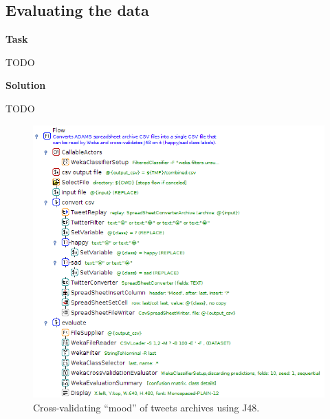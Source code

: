 \documentclass[a4paper,10pt]{book}
\newcommand{\heading}[1]{
  \vspace{0.3cm} \noindent \textbf{#1} \newline
}
\begin{document}
\subsection{Evaluating the data}

\heading{Task}
TODO

\heading{Solution}
TODO

\begin{figure}[htb]
  \centering
  \includegraphics[width=12.0cm]{images/crossvalidate_csv_archive-flow.png}
  \caption{Cross-validating ``mood'' of tweets archives using J48.}
  \label{crossvalidate_csv_archive-flow}
\end{figure}
\end{document}
